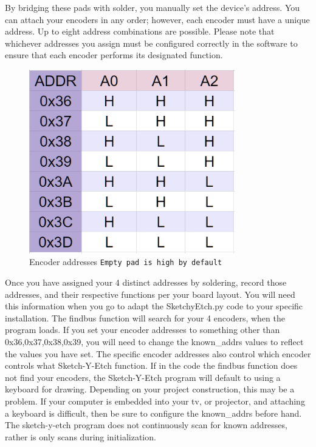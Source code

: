 \documentclass[]{article}
\begin{document}
By bridging these pads with solder, you manually set the device's address. You can attach your encoders in any order; however, each encoder must have a unique address. Up to eight address combinations are possible.
Please note that whichever addresses you assign must be configured correctly in the software to ensure that each encoder performs its designated function.
 
\begin{figure}[ht]
	\centering
	\includegraphics[width=0.8\textwidth]{rotaryEncTable.png}
	\caption{Encoder addresses \texttt{Empty pad is high by default} }
	\label{fig:address asignments}
	\end{figure}

Once you have assigned your 4 distinct addresses by soldering, record those addresses, and their respective functions per your board layout. You will need this information when you go to adapt the SketchyEtch.py code to your specific installation.
The findbus function will search for your 4 encoders, when the program loads. If you set your encoder addresses to something other than 0x36,0x37,0x38,0x39, you will need to change the known\_addrs values to reflect the values you have set. 
The specific encoder addresses also control which encoder controls what Sketch-Y-Etch function. If in the code the findbus function does not find your encoders, the Sketch-Y-Etch program will default to using a keyboard for drawing. Depending on your project construction, this may be a problem. If your computer is embedded into your tv, or projector, and attaching a keyboard is difficult, then be sure to configure the known\_addrs before hand.  The sketch-y-etch program does not continuously scan for known addresses, rather is only scans during initialization. 
\end{document}
